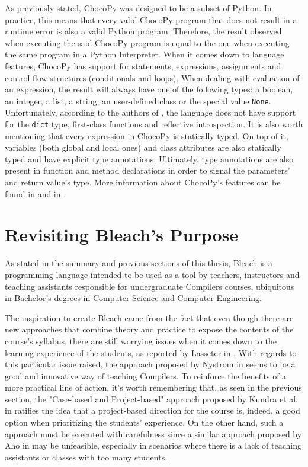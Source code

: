 \begin{itemize}
    As previously stated, ChocoPy was designed to be a subset of Python. In practice, this means that every valid ChocoPy program that does not result in a runtime error is also a valid Python program. Therefore, the result observed when executing the said ChocoPy program is equal to the one when executing the same program in a Python Interpreter. When it comes down to language features, ChocoPy has support for statements, expressions, assignments and control-flow structures (conditionals and loops). When dealing with evaluation of an expression, the result will always have one of the following types: a boolean, an integer, a list, a string, an user-defined class or the special value \texttt{None}. Unfortunately, according to the authors of \cite{padhye2019chocopy}, the language does not have support for the \texttt{dict} type, first-class functions and reflective introspection. It is also worth mentioning that every expression in ChocoPy is statically typed. On top of it, variables (both global and local ones) and class attributes are also statically typed and have explicit type annotations. Ultimately, type annotations are also present in function and method declarations in order to signal the parameters' and return value's type. More information about ChocoPy's features can be found in \cite{padhye2019chocopy} and in \cite{chocopy_v2.2_language_manual_reference}.
    
\end{itemize}

\section{Revisiting Bleach's Purpose}
As stated in the summary and previous sections of this thesis, Bleach is a programming language intended to be used as a tool by teachers, instructors and teaching assistants responsible for undergraduate Compilers courses, ubiquitous in Bachelor's degrees in Computer Science and Computer Engineering.

The inspiration to create Bleach came from the fact that even though there are new approaches that combine theory and practice to expose the contents of the course's syllabus, there are still worrying issues when it comes down to the learning experience of the students, as reported by Lasseter in \cite{lasseter2015interpreter}. With regards to this particular issue raised, the approach proposed by Nystrom in \cite{nystrom2021crafting} seems to be a good and innovative way of teaching Compilers. To reinforce the benefits of a more practical line of action, it's worth remembering that, as seen in the previous section, the "Case-based and Project-based" approach proposed by Kundra et al. in \cite{kundra2016experience} ratifies the idea that a project-based direction for the course is, indeed, a good option when prioritizing the students' experience. On the other hand, such a approach must be executed with carefulness since a similar approach proposed by Aho in \cite{aho2008teaching} may be unfeasible, especially in scenarios where there is a lack of teaching assistants or classes with too many students.

